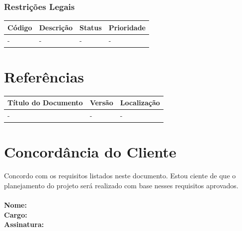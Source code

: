 \documentclass[a4paper, 12pt]{article}
\begin{document}
\subsubsection{Restrições Legais}
\begin{table}[ht]
	\centering

	\begin{tabular}{p{2cm}p{7cm}p{2cm}p{2cm}}
		\hline
		\cellcolor{gray}Código&\cellcolor{gray}Descrição&\cellcolor{gray}Status&\cellcolor{gray}Prioridade  \\
		\hline
		-&-&-&-\\
		\hline
	\end{tabular}
\end{table}%
\section{Referências}
\begin{table}[ht]
	\rowcolors{1}{}{}
	\centering

	\begin{tabular}{p{4cm}p{2cm}p{7.5cm}}
		\hline
		\cellcolor{gray}Título do Documento&\cellcolor{gray}Versão&\cellcolor{gray}Localização  \\
		\hline
		-&-&-\\
		\hline
	\end{tabular}
\end{table}
\section{Concordância do Cliente}
Concordo com os requisitos listados neste documento. Estou ciente de que o planejamento do projeto será realizado com base nesses requisitos aprovados.
\\\\
\textbf{Nome:}
\\
\textbf{Cargo:}
\\
\textbf{Assinatura:}
\end{document}
